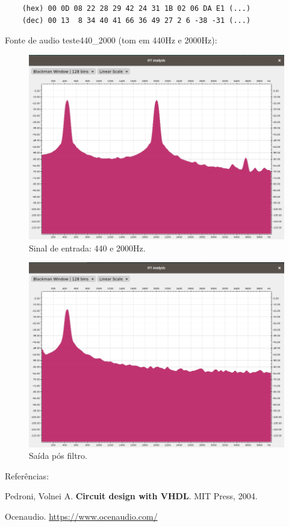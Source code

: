 \documentclass[12pt]{exam}
\begin{document}
\begin{questions}
	\begin{verbatim}
	(hex) 00 0D 08 22 28 29 42 24 31 1B 02 06 DA E1 (...)
	(dec) 00 13  8 34 40 41 66 36 49 27 2 6 -38 -31 (...)
	\end{verbatim}


	\question Fonte de audio teste440\_2000 (tom em 440Hz e 2000Hz):

	\begin{figure}[!htb]
		\centering
		\includegraphics[scale=1]{teste440_2000.png}
		\caption{Sinal de entrada: 440 e 2000Hz.}
		\label{fig:fir1}
	\end{figure}

	\begin{figure}[!htb]
		\centering
		\includegraphics[scale=1]{saida_teste440_2000.png}
		\caption{Saída pós filtro.}
		\label{fig:fir1}
	\end{figure}

\end{questions}

\newpage 

Referências:

\vspace{0.5cm}

Pedroni, Volnei A. \textbf{Circuit design with VHDL}. MIT Press, 2004.

Ocenaudio. \url{https://www.ocenaudio.com/}
\end{document}

